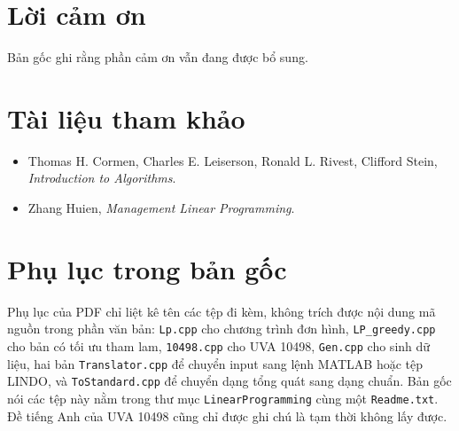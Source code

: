 \documentclass[11pt]{article}
\begin{document}
\section*{Lời cảm ơn}

Bản gốc ghi rằng phần cảm ơn vẫn đang được bổ sung.

\section*{Tài liệu tham khảo}

\begin{itemize}
  \item Thomas H. Cormen, Charles E. Leiserson, Ronald L. Rivest, Clifford
  Stein, \textit{Introduction to Algorithms}.
  \item Zhang Huien, \textit{Management Linear Programming}.
\end{itemize}

\section*{Phụ lục trong bản gốc}

Phụ lục của PDF chỉ liệt kê tên các tệp đi kèm, không trích được nội dung mã
nguồn trong phần văn bản: \texttt{Lp.cpp} cho chương trình đơn hình,
\texttt{LP\_greedy.cpp} cho bản có tối ưu tham lam, \texttt{10498.cpp} cho
UVA 10498, \texttt{Gen.cpp} cho sinh dữ liệu, hai bản \texttt{Translator.cpp}
để chuyển input sang lệnh MATLAB hoặc tệp LINDO, và \texttt{ToStandard.cpp}
để chuyển dạng tổng quát sang dạng chuẩn. Bản gốc nói các tệp này nằm trong
thư mục \texttt{LinearProgramming} cùng một \texttt{Readme.txt}. Đề tiếng Anh
của UVA 10498 cũng chỉ được ghi chú là tạm thời không lấy được.
\end{document}

